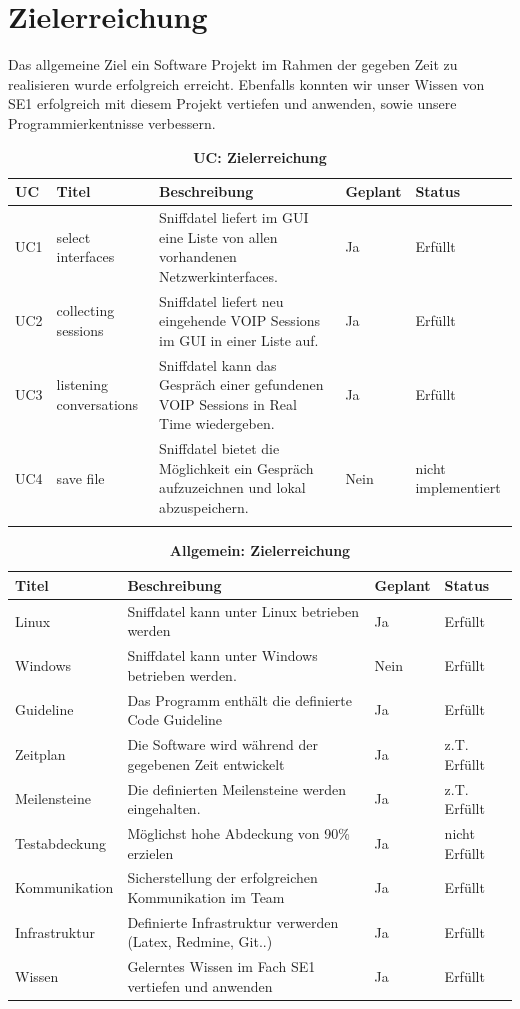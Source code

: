 \documentclass[a4,12pt]{scrartcl}
\begin{document}
\section{Zielerreichung}
Das allgemeine Ziel ein Software Projekt im Rahmen der gegeben Zeit zu realisieren wurde erfolgreich erreicht. Ebenfalls konnten wir unser Wissen von SE1 erfolgreich mit diesem Projekt vertiefen und anwenden, sowie unsere Programmierkentnisse verbessern. 
\begin{table}[H]
\centering
    \begin{tabular}{@{} p{1cm} p{3.5cm} p{5cm} p{2cm} p{3cm} @{}}\toprule    
    {UC} & {Titel} & {Beschreibung} & {Geplant} &{Status}\\ \midrule
    UC1 & select interfaces & Sniffdatel liefert im GUI eine Liste von allen vorhandenen Netzwerkinterfaces. & Ja & Erfüllt  \\ \addlinespace
    UC2 & collecting sessions & Sniffdatel liefert neu eingehende VOIP Sessions im GUI in einer Liste auf. & Ja & Erfüllt \\ \addlinespace
    UC3 & listening conversations & Sniffdatel kann das Gespräch einer gefundenen VOIP Sessions in Real Time wiedergeben. & Ja & Erfüllt \\ \addlinespace
    UC4 & save file &  Sniffdatel bietet die Möglichkeit ein Gespräch aufzuzeichnen und lokal abzuspeichern. & Nein & nicht implementiert \\ \addlinespace
    \bottomrule
    \end{tabular}
\caption{\textbf{UC: Zielerreichung}}
\end{table}
\begin{table}[H]
\centering
    \begin{tabular}{@{} p{3.5cm} p{6cm} p{2cm} p{3cm} @{}}\toprule    
    {Titel} & {Beschreibung} & {Geplant} &{Status}\\ \midrule
    Linux & Sniffdatel kann unter Linux betrieben werden & Ja & Erfüllt\\ \addlinespace
    Windows & Sniffdatel kann unter Windows betrieben werden. & Nein & Erfüllt\\ \addlinespace
    Guideline & Das Programm enthält die definierte Code Guideline & Ja & Erfüllt\\ \addlinespace
    Zeitplan & Die Software wird während der gegebenen Zeit entwickelt & Ja & z.T. Erfüllt\\ \addlinespace 
    Meilensteine & Die definierten Meilensteine werden eingehalten. & Ja & z.T. Erfüllt\\ \addlinespace
    Testabdeckung & Möglichst hohe Abdeckung von 90\% erzielen & Ja & nicht Erfüllt\\ \addlinespace 
    Kommunikation & Sicherstellung der erfolgreichen Kommunikation im Team & Ja & Erfüllt\\ \addlinespace
    Infrastruktur & Definierte Infrastruktur verwerden (Latex, Redmine, Git..) & Ja & Erfüllt\\ \addlinespace
    Wissen & Gelerntes Wissen im Fach SE1 vertiefen und anwenden & Ja & Erfüllt\\
    \bottomrule
    \end{tabular}
\caption{\textbf{Allgemein: Zielerreichung}}
\end{table}
\end{document}

